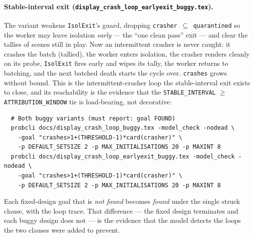 \documentclass[a4paper,10pt,fleqn]{article}
\begin{document}
\paragraph{Stable-interval exit
(\texttt{display\_crash\_loop\_earlyexit\_buggy.tex}).}
The variant weakens \texttt{IsolExit}'s guard, dropping \texttt{crasher $\subseteq$
quarantined} so the worker may leave isolation \emph{early} --- the ``one clean
pass'' exit --- and clear the tallies of scenes still in play.  Now an intermittent
crasher is never caught: it crashes the batch (tallied), the worker enters
isolation, the crasher renders cleanly on its probe, \texttt{IsolExit} fires early
and wipes its tally, the worker returns to batching, and the next batched death
starts the cycle over.  \texttt{crashes} grows without bound.  This is the
intermittent-crasher loop the stable-interval exit exists to close, and its
reachability is the evidence that the \texttt{STABLE\_INTERVAL} $\geq$
\texttt{ATTRIBUTION\_WINDOW} tie is load-bearing, not decorative:
\begin{verbatim}
  # Both buggy variants (must report: goal FOUND)
  probcli docs/display_crash_loop_buggy.tex -model_check -nodead \
    -goal "crashes>1+(THRESHOLD-1)*card(crasher)" \
    -p DEFAULT_SETSIZE 2 -p MAX_INITIALISATIONS 20 -p MAXINT 8
  probcli docs/display_crash_loop_earlyexit_buggy.tex -model_check -nodead \
    -goal "crashes>1+(THRESHOLD-1)*card(crasher)" \
    -p DEFAULT_SETSIZE 2 -p MAX_INITIALISATIONS 20 -p MAXINT 8
\end{verbatim}

Each fixed-design goal that is \emph{not found} becomes \emph{found} under the
single struck clause, with the loop trace.  That difference --- the fixed design
terminates and each buggy design does not --- is the evidence that the model
detects the loops the two clauses were added to prevent.
\end{document}
